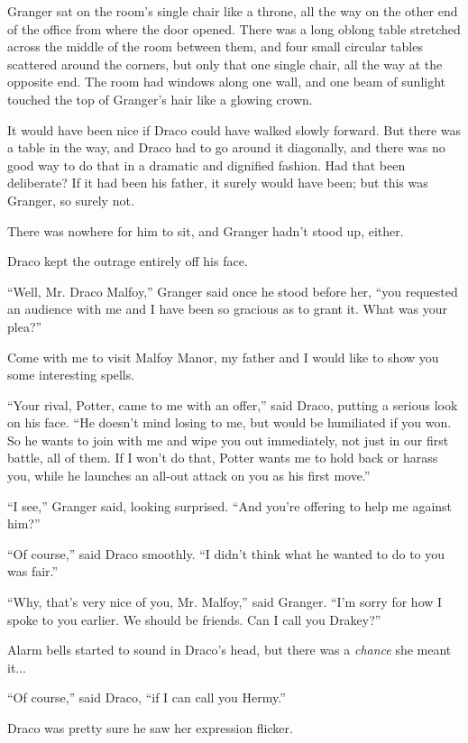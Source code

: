 Granger sat on the room's single chair like a throne, all the way on the
other end of the office from where the door opened. There was a long
oblong table stretched across the middle of the room between them, and
four small circular tables scattered around the corners, but only that
one single chair, all the way at the opposite end. The room had windows
along one wall, and one beam of sunlight touched the top of Granger's
hair like a glowing crown.

It would have been nice if Draco could have walked slowly forward. But
there was a table in the way, and Draco had to go around it diagonally,
and there was no good way to do that in a dramatic and dignified
fashion. Had that been deliberate? If it had been his father, it surely
would have been; but this was Granger, so surely not.

There was nowhere for him to sit, and Granger hadn't stood up, either.

Draco kept the outrage entirely off his face.

``Well, Mr. Draco Malfoy,'' Granger said once he stood before her, ``you
requested an audience with me and I have been so gracious as to grant
it. What was your plea?''

Come with me to visit Malfoy Manor, my father and I would like to show
you some interesting spells.

``Your rival, Potter, came to me with an offer,'' said Draco, putting a
serious look on his face. ``He doesn't mind losing to me, but would be
humiliated if you won. So he wants to join with me and wipe you out
immediately, not just in our first battle, all of them. If I won't do
that, Potter wants me to hold back or harass you, while he launches an
all-out attack on you as his first move.''

``I see,'' Granger said, looking surprised. ``And you're offering to
help me against him?''

``Of course,'' said Draco smoothly. ``I didn't think what he wanted to
do to you was fair.''

``Why, that's very nice of you, Mr. Malfoy,'' said Granger. ``I'm sorry
for how I spoke to you earlier. We should be friends. Can I call you
Drakey?''

Alarm bells started to sound in Draco's head, but there was a
\emph{chance} she meant it...

``Of course,'' said Draco, ``if I can call you Hermy.''

Draco was pretty sure he saw her expression flicker.

